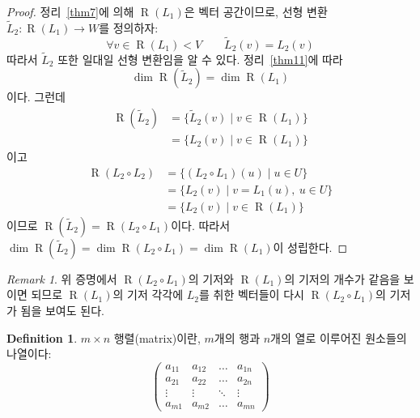 \documentclass[unfonts,oneside,a4paper]{oblivoir}
\theoremstyle{definition}
\newtheorem{definition}{Definition}
\theoremstyle{theorem}
\theoremstyle{remark}
\newtheorem*{remark}{Remark}
\theoremstyle{remark}
\theoremstyle{remark}
\theoremstyle{remark}
\renewcommand{\vec}[1]{\bm{\mathit{#1}}}
\DeclareMathOperator{\Range}{R}
\begin{document}
\begin{proof}
    정리~\ref{thm7}에 의해 $\Range(L_1)$은 벡터 공간이므로, 선형 변환 $\tilde L_2: \Range(L_1) \rightarrow W$를 정의하자:
    \begin{equation*}
        \forall \vec v \in \Range(L_1) < V \qquad \tilde L_2(\vec v) = L_2(\vec v)
    \end{equation*}
    따라서 $\tilde L_2$ 또한 일대일 선형 변환임을 알 수 있다.
    정리~\ref{thm11}에 따라 
    \begin{equation*}
        \dim \Range(\tilde L_2) = \dim \Range(L_1)
    \end{equation*}
    이다.
    그런데
    \begin{align*}
        \Range(\tilde L_2) &= \{\tilde L_2 (\vec v) \mid \vec v \in \Range(L_1)\}\\
                          &= \{L_2(\vec v) \mid \vec v \in \Range(L_1)\}
    \end{align*}
    이고
    \begin{align*}
        \Range(L_2 \circ L_2) &= \{(L_2 \circ L_1) (\vec u) \mid \vec u \in U\}\\
                        &= \{L_2(\vec v) \mid \vec v = L_1(\vec u),\ \vec u \in U\}\\
                        &= \{L_2(\vec v) \mid \vec v \in \Range(L_1)\}
    \end{align*}
    이므로 $\Range(\tilde L_2) = \Range(L_2 \circ L_1)$이다.
    따라서 $\dim \Range(\tilde L_2) = \dim \Range(L_2 \circ L_1) = \dim \Range(L_1)$이 성립한다.
\end{proof}

\begin{remark}
    위 증명에서 $\Range(L_2 \circ L_1)$의 기저와 $\Range(L_1)$의 기저의 개수가 같음을 보이면 되므로 $\Range(L_1)$의 기저 각각에 $L_2$를 취한 벡터들이 다시 $\Range(L_2 \circ L_1)$의 기저가 됨을 보여도 된다.
\end{remark}

\begin{definition}
    $m \times n$ 행렬(matrix)이란, $m$개의 행과 $n$개의 열로 이루어진 원소들의 나열이다:
    \begin{equation*}
        \begin{pmatrix}
            a_{11} & a_{12} & \dots & a_{1n}\\
            a_{21} & a_{22} & \dots & a_{2n}\\
            \vdots & \vdots & \ddots & \vdots\\
            a_{m1} & a_{m2} & \dots & a_{mn}
        \end{pmatrix}
    \end{equation*}
\end{definition}
\end{document}
